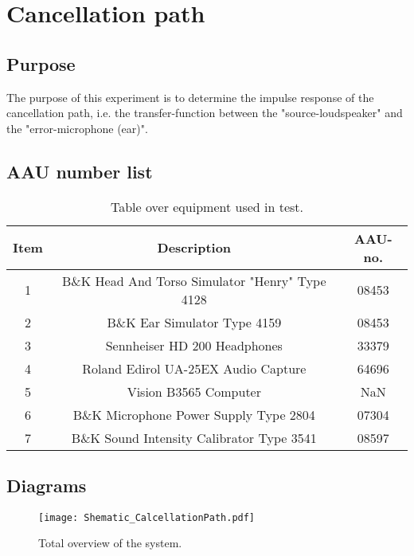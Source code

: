 \section{Cancellation path}
\subsection{Purpose}
The purpose of this experiment is to determine the impulse response of the cancellation path, i.e. the transfer-function between the "source-loudspeaker" and the "error-microphone (ear)".
		
\subsection{AAU number list}
\begin{table}[h]
	\centering
	\begin{tabular}{ c c c } \toprule
		{Item}	& {Description} 						& {AAU-no}. \\ \bottomrule 
		1	&	B\&K Head And Torso Simulator "Henry" Type 4128	& 08453		\\
		2	&	B\&K Ear Simulator Type 4159			& 08453		\\
		3	&	Sennheiser HD 200	Headphones			& 33379		\\
		4	&	Roland Edirol UA-25EX Audio Capture		& 64696		\\
		5	&	Vision B3565 Computer					& NaN		\\
		6	&	B\&K Microphone Power Supply Type 2804	& 07304		\\
		7	&	B\&K Sound Intensity Calibrator Type 3541	& 08597	\\ \bottomrule
	\end{tabular}
	\caption{Table over equipment used in test.}
	\label{tab:UsedEquipmentListningCP}
\end{table}

\subsection{Diagrams}
\begin{figure}[H]
	\centering
	\texttt{[image: Shematic\_CalcellationPath.pdf]}
	\caption{Total overview of the system.}
	\label{SchematicOverview}
\end{figure}

